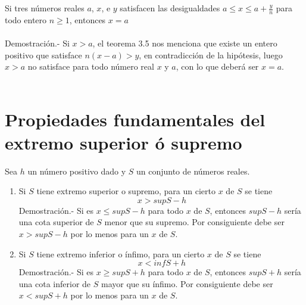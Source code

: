 \begin{teo}
Si tres números reales $a$, $x$, e $y$ satisfacen las desigualdades $a\leq x \leq a+\displaystyle\frac{y}{n}$ para todo entero $n \geq 1$, entonces $x=a$\\\\
Demostración.- \; Si $x>a$, el teorema 3.5 nos menciona que existe un entero positivo que satisface $n(x-a)>y$, en contradicción de la hipótesis, luego $x>a$ no satisface para todo número real $x$ y $a$, con lo que deberá ser $x=a$.\\\\
\end{teo} 

\section*{Propiedades fundamentales del extremo superior ó supremo}
\begin{teo}
Sea $h$ un número positivo dado y $S$ un conjunto de números reales.
\begin{enumerate}[\bfseries a)]
\item Si $S$ tiene extremo superior o supremo, para un cierto $x$ de $S$ se tiene 
$$x>supS-h$$
Demostración.- \; Si es $x\leq supS -h$ para todo $x$ de $S$, entonces $supS-h$ sería una cota superior de $S$ menor que su supremo. Por consiguiente debe ser $x>supS-h$ por lo menos para un $x$ de $S$.
\item Si $S$ tiene extremo inferior o ínfimo, para un cierto $x$ de $S$ se tiene 
$$x<infS+h$$
Demostración.- \; Si es $x \geq supS+h$ para todo $x$ de $S$, entonces $supS+h$ sería una cota inferior de $S$ mayor que su ínfimo. Por consiguiente debe ser $x<supS+h$ por lo menos para un $x$ de $S$.
\end{enumerate}
\end{teo}

